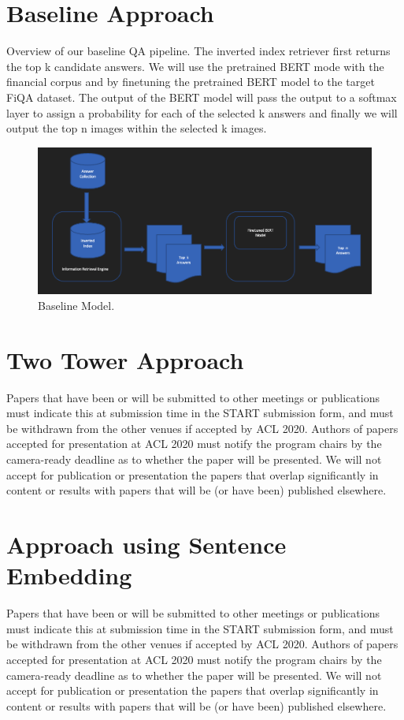 \documentclass[11pt,a4paper]{article}
\begin{document}
\section{Baseline Approach}
Overview of our baseline QA pipeline. The inverted index retriever first returns the top k candidate answers. We will use the pretrained BERT mode with the financial corpus and by finetuning the pretrained BERT model to the target FiQA dataset. The output of the BERT model will pass the output to a softmax layer to assign a probability for each of the selected k answers and finally we will output the top n images within the selected k images.

\begin{figure}
  \includegraphics[width=\linewidth]{baseline.png}
  \caption{Baseline Model.}
  \label{fig:baseline model}
\end{figure}

\section{Two Tower Approach}
Papers that have been or will be submitted to other meetings or publications must indicate this at submission time in the START submission form, and must be withdrawn from the other venues if accepted by ACL 2020. Authors of papers accepted for presentation at ACL 2020 must notify the program chairs by the camera-ready deadline as to whether the paper will be presented. We will not accept for publication or presentation the papers that overlap significantly in content or results with papers that will be (or have been) published elsewhere.


\section{Approach using Sentence Embedding}
Papers that have been or will be submitted to other meetings or publications must indicate this at submission time in the START submission form, and must be withdrawn from the other venues if accepted by ACL 2020. Authors of papers accepted for presentation at ACL 2020 must notify the program chairs by the camera-ready deadline as to whether the paper will be presented. We will not accept for publication or presentation the papers that overlap significantly in content or results with papers that will be (or have been) published elsewhere.
\end{document}
